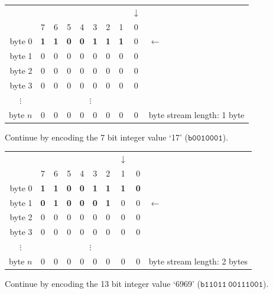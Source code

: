 \documentclass[11pt,letterpaper]{book}
\newcommand{\bin}[1]{\ensuremath{\mathtt{b#1}}}
\numberwithin{equation}{chapter}
\numberwithin{figure}{chapter}
\numberwithin{table}{chapter}
\begin{document}
\begin{tabular}{r|ccccccccl}
\multicolumn{1}{r}{} &&&&&&&&$\downarrow$& \\
         & 7 & 6 & 5 & 4 & 3 & 2 & 1 & 0 & \\\cline{1-9}
byte 0   & \textbf{1} & \textbf{1} & \textbf{0} & \textbf{0} &
           \textbf{1} & \textbf{1} & \textbf{1} & 0 & $\leftarrow$ \\
byte 1   & 0 & 0 & 0 & 0 & 0 & 0 & 0 & 0 &                         \\
byte 2   & 0 & 0 & 0 & 0 & 0 & 0 & 0 & 0 &                         \\
byte 3   & 0 & 0 & 0 & 0 & 0 & 0 & 0 & 0 &                         \\
\multicolumn{1}{c|}{$\vdots$}&\multicolumn{8}{c}{$\vdots$}&        \\
byte $n$ & 0 & 0 & 0 & 0 & 0 & 0 & 0 & 0 &
byte stream length: 1 byte
\end{tabular}
\vspace{\baselineskip}

Continue by encoding the 7 bit integer value `17' (\bin{0010001}).

\begin{tabular}{r|ccccccccl}
\multicolumn{1}{r}{} &&&&&&&$\downarrow$&& \\
         & 7 & 6 & 5 & 4 & 3 & 2 & 1 & 0 & \\\cline{1-9}
byte 0   & \textbf{1} & \textbf{1} & \textbf{0} & \textbf{0} &
           \textbf{1} & \textbf{1} & \textbf{1} & \textbf{0} & \\
byte 1   & \textbf{0} & \textbf{1} & \textbf{0} & \textbf{0} &
           \textbf{0} & \textbf{1} & 0 & 0 & $\leftarrow$      \\
byte 2   & 0 & 0 & 0 & 0 & 0 & 0 & 0 & 0 &                     \\
byte 3   & 0 & 0 & 0 & 0 & 0 & 0 & 0 & 0 &                     \\
\multicolumn{1}{c|}{$\vdots$}&\multicolumn{8}{c}{$\vdots$}&    \\
byte $n$ & 0 & 0 & 0 & 0 & 0 & 0 & 0 & 0 &
byte stream length: 2 bytes
\end{tabular}
\vspace{\baselineskip}

Continue by encoding the 13 bit integer value `6969' (\bin{11011\ 00111001}).
\end{document}
